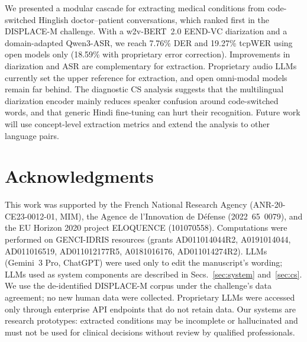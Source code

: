 \documentclass{article}
\begin{document}
We presented a modular cascade for extracting medical conditions from code-switched Hinglish doctor--patient conversations, which ranked first in the DISPLACE-M challenge.
With a w2v-BERT~2.0 EEND-VC diarization and a domain-adapted Qwen3-ASR, we reach 7.76\% DER and 19.27\% tcpWER using open models only (18.59\% with proprietary error correction).
Improvements in diarization and ASR are complementary for extraction.
Proprietary audio LLMs currently set the upper reference for extraction, and open omni-modal models remain far behind.
The diagnostic CS analysis suggests that the multilingual diarization encoder mainly reduces speaker confusion around code-switched words, and that generic Hindi fine-tuning can hurt their recognition.
Future work will use concept-level extraction metrics and extend the analysis to other language pairs.


\newpage

\section{Acknowledgments}
\label{sec:ack}
\sloppy This work was supported by the French National Research Agency (ANR-20-CE23-0012-01, MIM), the Agence de l'Innovation de D\'efense (2022~65~0079), and the EU Horizon 2020 project ELOQUENCE (101070558). Computations were performed on GENCI-IDRIS resources (grants AD011014044R2, A0191014044, AD011016519, AD011012177R5, A0181016176, AD011014274R2).
LLMs (Gemini~3 Pro, ChatGPT) were used only to edit the manuscript's wording; LLMs used as system components are described in Secs.~\ref{sec:system} and~\ref{sec:cs}.
We use the de-identified DISPLACE-M corpus under the challenge's data agreement; no new human data were collected. Proprietary LLMs were accessed only through enterprise API endpoints that do not retain data. Our systems are research prototypes: extracted conditions may be incomplete or hallucinated and must not be used for clinical decisions without review by qualified professionals.


\let\oldthebibliography\thebibliography
\renewcommand{\thebibliography}[1]{\oldthebibliography{#1}\setlength{\itemsep}{0pt}\setlength{\parsep}{0pt}}


\end{document}
